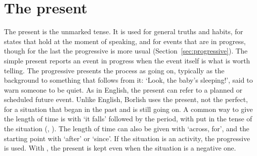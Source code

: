 \section{The present}\label{sec:present}
The present is the unmarked tense. It is used for general truths and habits, for states that hold at the moment of speaking, and for events that are in progress, though for the last the progressive is more usual (Section~\ref{sec:progressive}).
The simple present reports an event in progress when the event itself is what is worth telling. The progressive presents the process as going on, typically as the background to something that follows from it:  `Look, the baby's sleeping!', said to warn someone to be quiet.
As in English, the present can refer to a planned or scheduled future event.
Unlike English, Borlish uses the present, not the perfect, for a situation that began in the past and is still going on. A common way to give the length of time is with  `it falls' followed by the period, with  put in the tense of the situation (, ). The length of time can also be given with  `across, for', and the starting point with  `after' or  `since'. If the situation is an activity, the progressive is used.
With , the present is kept even when the situation is a negative one.
